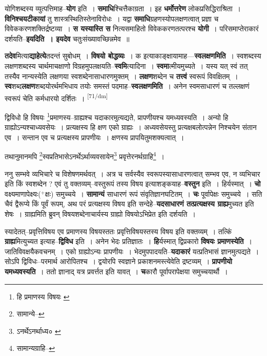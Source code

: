\documentclass[article,12pt,a4paper]{memoir}
\newcommand{\add}[1]{($^{+}$#1)}
\begin{document}
	  \pstart योगिशब्दस्य व्युत्पत्तिमाह--\textbf{योग} इति । \textbf{समाधि}श्चित्तैकाग्रता । इह \textbf{धर्मोत्तरेण} लोकप्रसिद्धिराश्रिता । \textbf{विनिश्चयटीकायां} तु शास्त्रस्थितिस्तेनाविरोधः । यद्वा \textbf{समाधि}ग्रहणस्योपलक्षणत्वात् प्रज्ञा च विवेककरणशक्तिर्द्रष्टव्या । \textbf{स यस्यास्ति स} नित्यसमाहितो विवेककरणतत्परश्च \textbf{योगी} । परिसमाप्तेराकारं दर्शयति--\textbf{इयदिति । इयदेव} चतुःसंख्यावच्छिन्नमेव ॥
	\pend
      

	  \pstart \textbf{तदेव}मित्या\textbf{द्याहेत्ये}तदन्तं सुबोधम् । \textbf{विषयो बोद्धव्यः} । क इत्याकाङ्क्षायामाह—\textbf{स्वलक्षणमिति} । स्वशब्दस्य लक्षणशब्दस्य चार्थमाचक्षाणो विग्रहमुपलक्षयति--\textbf{स्वमि}त्यादिना । \textbf{स्वमा}त्मीयमुच्यते । यस्य यत् स्वं तत् तस्यैव नान्यस्येति लक्षणया स्वशब्देनासाधारणमुक्तम् । \textbf{लक्षण}शब्देन च \textbf{तत्त्वं} स्वरूपं विवक्षितम् । \textbf{स्व}शब्द\textbf{लक्षण}शब्दयोरर्थमभिधाय तयोः समस्तं पदमाह--\textbf{स्वलक्षणमिति} । अनेन स्वमसाधारणं च तल्लक्षणं स्वरूपं चेति कर्मधारयो दर्शितः ।
	\pend
      \leavevmode\textsuperscript{\rmlatinfont\tiny [71/dm]}

	  \pstart द्विविधो हि विषयः \footnote{हि प्रमाणस्य विषयः \cite{dp-msA} \cite{dp-edP} \cite{dp-edH} \cite{dp-edN}}प्रमाणस्य--ग्राह्यश्च यदाकारमुत्यद्यते, प्रापणीयश्च यमध्यवस्यति । अन्यो हि ग्राह्योऽन्यश्चाध्यवसेयः । प्रत्यक्षस्य हि क्षण एको ग्राह्यः । अध्यवसेयस्तु प्रत्यक्षबलोत्पन्नेन निश्चयेन संतान एव । सन्तान एव च प्रत्यक्षस्य प्रापणीयः । क्षणस्य प्रापयितुमशक्यत्वात् ।
	\pend
       

	  \pstart तथानुमानमपि \footnote{सामान्ये--\cite{dp-msD-n}}स्वप्रतिभासेऽनर्थेऽर्थाव्यवसायेन\footnote{ऽनर्थेऽनर्थाध्य० \cite{dp-msA} \cite{dp-edP} \cite{dp-edH}} प्रवृत्तेरनर्थग्राहि\footnote{सामान्यग्राहि--\cite{dp-msD-n}} ।
	\pend
      

	  \pstart ननु सम्भवे व्यभिचारे च विशेषणमर्थवत् । अत्र च सर्वस्यैव स्वरूपस्यासाधारणत्वात् सम्भव एव, न व्यभिचार इति किं स्वशब्देन ? एवं तु वक्तव्यम्--वस्तुरूपं तस्य विषय इत्याशङ्कयाह--\textbf{वस्तुन} इति । हिर्यस्मात् । \textbf{चो} वक्ष्यमाणापेक्ष्यः\add{क्षः} समुच्चये । \textbf{सामान्यं} साधारणं रूपं संवृतिज्ञानघटितम् । \textbf{चः} पूर्वापेक्षः समुच्चये । सति चैवं द्वैरूप्ये किं पूर्वं रूपम्, अथ परं प्रत्यक्षस्य विषय इति सन्देहे--\textbf{यदसाधारणं तत्प्रत्यक्षस्य ग्राह्य}मुच्यत इति शेषः । ग्राह्यमिति ब्रुवन् विषयशब्देनाचार्यस्य ग्राह्यो विषयोऽभिप्रेत इति दर्शयति ।
	\pend
      

	  \pstart स्यादेतत्--प्रवृत्तिविषय एव प्रमाणस्य विषयस्ततः प्रवृत्तिविषयस्तस्य विषय इति वक्तव्यम् । तत्किं \textbf{ग्राह्य}मित्युच्यत इत्याह--\textbf{द्विविध} इति । अनेन भेदः प्रतिज्ञातः । \textbf{हि}र्यस्मात् द्विप्रकारो \textbf{विषयः प्रमाणस्येति} । जातिविवक्षयैकवचनम् । एको ग्राह्योऽन्यः प्रापणीयः । भेदमुपपादयति--\textbf{यदाकारं} यत्प्रतिभासं ज्ञानमुत्पद्यते । सोऽपि द्विविधः--परमार्थ आरोपितश्च । द्वयोरपि स्वज्ञाने प्रकाशनमस्त्येवेति द्रष्टव्यम् । \textbf{प्रापणीयो यमध्यवस्यति} । ततो ज्ञानाद् यत्र प्रवर्त्तत इति यावत् । \textbf{च}कारौ पूर्वापरापेक्षया समुच्चयार्थौ ।
	\pend
      
\end{document}
